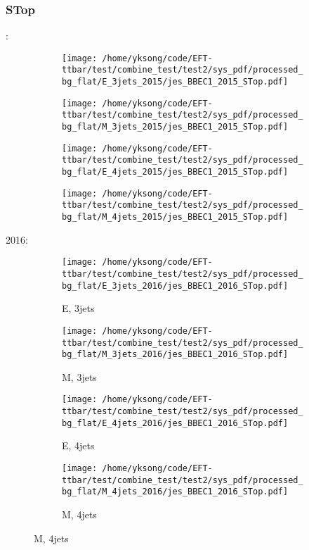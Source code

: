 \documentclass{beamer}
\begin{document}
\begin{frame}
\frametitle{STop}
\fontsize{5}{1}:
\begin{figure}
\centering
\begin{subfigure}[b]{0.24\textwidth}
\texttt{[image: /home/yksong/code/EFT-ttbar/test/combine\_test/test2/sys\_pdf/processed\_bg\_flat/E\_3jets\_2015/jes\_BBEC1\_2015\_STop.pdf]}
\end{subfigure}
\begin{subfigure}[b]{0.24\textwidth}
\texttt{[image: /home/yksong/code/EFT-ttbar/test/combine\_test/test2/sys\_pdf/processed\_bg\_flat/M\_3jets\_2015/jes\_BBEC1\_2015\_STop.pdf]}
\end{subfigure}
\begin{subfigure}[b]{0.24\textwidth}
\texttt{[image: /home/yksong/code/EFT-ttbar/test/combine\_test/test2/sys\_pdf/processed\_bg\_flat/E\_4jets\_2015/jes\_BBEC1\_2015\_STop.pdf]}
\end{subfigure}
\begin{subfigure}[b]{0.24\textwidth}
\texttt{[image: /home/yksong/code/EFT-ttbar/test/combine\_test/test2/sys\_pdf/processed\_bg\_flat/M\_4jets\_2015/jes\_BBEC1\_2015\_STop.pdf]}
\end{subfigure}
\end{figure}
2016:
\begin{figure}
\centering
\begin{subfigure}[b]{0.24\textwidth}
\texttt{[image: /home/yksong/code/EFT-ttbar/test/combine\_test/test2/sys\_pdf/processed\_bg\_flat/E\_3jets\_2016/jes\_BBEC1\_2016\_STop.pdf]}
\captionsetup{font=tiny}
\caption{E, 3jets}
\end{subfigure}
\begin{subfigure}[b]{0.24\textwidth}
\texttt{[image: /home/yksong/code/EFT-ttbar/test/combine\_test/test2/sys\_pdf/processed\_bg\_flat/M\_3jets\_2016/jes\_BBEC1\_2016\_STop.pdf]}
\captionsetup{font=tiny}
\caption{M, 3jets}
\end{subfigure}
\begin{subfigure}[b]{0.24\textwidth}
\texttt{[image: /home/yksong/code/EFT-ttbar/test/combine\_test/test2/sys\_pdf/processed\_bg\_flat/E\_4jets\_2016/jes\_BBEC1\_2016\_STop.pdf]}
\captionsetup{font=tiny}
\caption{E, 4jets}
\end{subfigure}
\begin{subfigure}[b]{0.24\textwidth}
\texttt{[image: /home/yksong/code/EFT-ttbar/test/combine\_test/test2/sys\_pdf/processed\_bg\_flat/M\_4jets\_2016/jes\_BBEC1\_2016\_STop.pdf]}
\captionsetup{font=tiny}
\caption{M, 4jets}
\end{subfigure}
\end{figure}
\end{frame}
\end{document}
